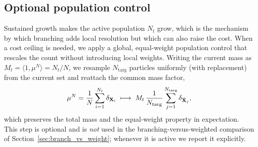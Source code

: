\documentclass[a4paper,fleqn]{cas-sc}
\theoremstyle{definition}
\theoremstyle{remark}
\begin{document}
\subsection{Optional population control}
\label{sec:popcontrol}
Sustained growth makes the active population $N_t$ grow, which is the mechanism by which branching adds local
resolution but which can also raise the cost. When a cost ceiling is needed, we apply a global, equal-weight
population control that rescales the count without introducing local weights. Writing the current mass as
$M_t=\langle 1,\mu^N\rangle = N_t/N$, we resample $N_{\mathrm{targ}}$ particles uniformly (with replacement)
from the current set and reattach the common mass factor,
\begin{equation}
\mu^N=\frac1N\sum_{i=1}^{N_t}\delta_{\mathbf{X}_i}
\;\longmapsto\;
M_t\,\frac1{N_{\mathrm{targ}}}\sum_{j=1}^{N_{\mathrm{targ}}}\delta_{\tilde{\mathbf{X}}_j},
\end{equation}
which preserves the total mass and the equal-weight property in expectation. This step is optional and is
\emph{not} used in the branching-versus-weighted comparison of Section~\ref{sec:branch_vs_weight}; whenever it is
active we report it explicitly.
\end{document}
